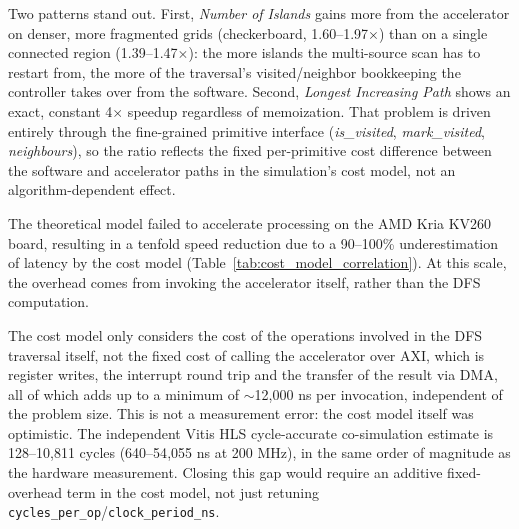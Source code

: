 \documentclass[conference]{IEEEtran}
\begin{document}
Two patterns stand out. First, \textit{Number of Islands} gains more from the
accelerator on denser, more fragmented grids (checkerboard, 1.60--1.97$\times$)
than on a single connected region (1.39--1.47$\times$): the more islands the
multi-source scan has to restart from, the more of the traversal's
visited/neighbor bookkeeping the controller takes over from the software.
Second, \textit{Longest Increasing Path} shows an exact, constant
4$\times$ speedup regardless of memoization. That problem is driven entirely
through the fine-grained primitive interface (\textit{is\_visited},
\textit{mark\_visited}, \textit{neighbours}), so the ratio reflects the fixed
per-primitive cost difference between the software and accelerator paths in
the simulation's cost model, not an algorithm-dependent effect.

The theoretical model failed to accelerate processing on the AMD Kria
KV260 board, resulting in a tenfold speed reduction due to a 90--100\%
underestimation of latency by the cost model (Table~\ref{tab:cost_model_correlation}).
At this scale, the overhead comes from invoking the accelerator itself,
rather than the DFS computation.

The cost model only considers the cost of the operations involved in the
DFS traversal itself, not the fixed cost of calling the accelerator over
AXI, which is register writes, the interrupt round trip and the transfer
of the result via DMA, all of which adds up to a minimum of
$\sim$12{,}000 ns per invocation, independent of the problem size. This
is not a measurement error: the cost model itself was optimistic. The
independent Vitis HLS cycle-accurate co-simulation estimate is
128--10{,}811 cycles (640--54{,}055 ns at 200 MHz), in the same order of
magnitude as the hardware measurement. Closing this gap would require an additive fixed-overhead term in the
cost model, not just retuning \texttt{cycles\_per\_op}/\texttt{clock\_period\_ns}.
\end{document}
